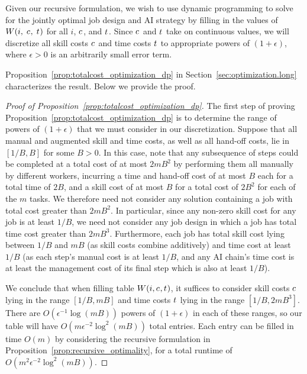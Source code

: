 Given our recursive formulation, we wish to use dynamic programming to solve for the jointly optimal job design and AI strategy by filling in the values of $W(i,\; c_{},\; t_{})$ for all $i$, $c_{}$, and $t_{}$.  
Since $c_{}$ and $t_{}$ take on continuous values, we will discretize all skill costs $c_{}$ and time costs $t_{}$ to appropriate powers of $(1+\epsilon)$, where $\epsilon > 0$ is an arbitrarily small error term.  

Proposition~\ref{prop:totalcost_optimization_dp} in Section~\ref{sec:optimization.long} characterizes the result.
Below we provide the proof.

\begin{proof}[Proof of Proposition~\ref{prop:totalcost_optimization_dp}]
The first step of proving Proposition~\ref{prop:totalcost_optimization_dp} is to determine the range of powers of $(1+\epsilon)$ that we must consider in our discretization. 
Suppose that all manual and augmented skill and time costs, as well as all hand-off costs, lie in $[1/B, B]$ for some $B > 0$.  
In this case, note that any subsequence of steps could be completed at a total cost of at most $2mB^2$ by performing them all manually by different workers, incurring a  time and hand-off cost of at most $B$ each for a total time of $2B$, and a skill cost of at most $B$ for a total cost of $2B^2$ for each of the $m$ tasks. 
We therefore need not consider any solution containing a job with total cost greater than $2mB^2$.  
In particular, since any non-zero skill cost for any job is at least $1/B$, we need not consider any job design in which a job has total time cost greater than $2mB^3$.
Furthermore, each job has total skill cost lying between $1/B$ and $mB$ (as skill costs combine additively) and time cost at least $1/B$ (as each step's manual cost is at least $1/B$, and any AI chain's time cost is at least the management cost of its final step which is also at least $1/B$).

We conclude that when filling table $W(i, c_{}, t_{})$, it suffices to consider skill costs $c_{}$ lying in the range $[1/B, mB]$ and time costs $t_{}$ lying in the range $[1/B, 2mB^3]$.  There are $O(\epsilon^{-1} \log(mB))$ powers of $(1+\epsilon)$ in each of these ranges, so our table will have $O(m \epsilon^{-2} \log^2(mB))$ total entries. 
Each entry can be filled in time $O(m)$ by considering the recursive formulation in Proposition~\ref{prop:recursive_optimality}, for a total runtime of $O(m^2 \epsilon^{-2} \log^2(mB))$.


\end{proof}

